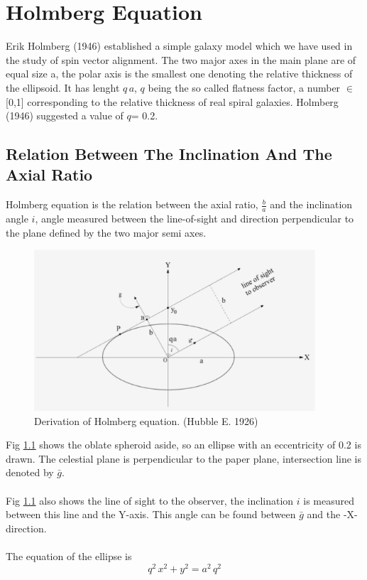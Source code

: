 \chapter{Holmberg Equation}\label{holm}
Erik Holmberg (1946) established a simple galaxy model which we have used in the study of spin vector alignment. The two major axes in the main plane are of equal size a, the polar axis is the smallest one denoting the relative thickness of the ellipsoid. It has lenght $q\,a$, $q$ being the so called flatness factor, a number $\in$ [0,1] corresponding to the relative thickness of real spiral galaxies. Holmberg (1946) suggested a value of $q$= 0.2.
\section{Relation Between The Inclination And The Axial Ratio}
Holmberg equation is the relation between the axial ratio, $\frac{b}{a}$ and the inclination angle $i$, angle measured between the line-of-sight and direction perpendicular to the plane defined by the two major semi axes.
\begin{figure}
\centering
	\includegraphics[height=6cm]{hom.eps}
	\caption{Derivation of Holmberg equation. (Hubble E. 1926)}\label{hom}
\end{figure}
Fig \ref{hom} shows the oblate spheroid aside, so an ellipse with an eccentricity of 0.2 is drawn. The celestial plane is perpendicular to the paper plane, intersection line is denoted by $\bar{g}$.\\\\
Fig \ref{hom} also shows the line of sight to the observer, the inclination $i$ is measured between this line and the Y-axis. This angle can be found between $\bar{g}$ and the -X-direction.\\\\
The equation of the ellipse is
\begin{equation}\label{ellipse}
q^2\,x^2 + y^2 = a^2\,q^2
\end{equation}
